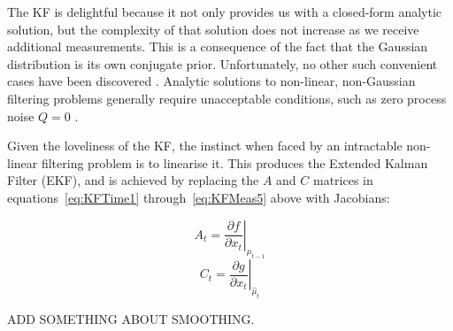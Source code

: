 The KF is delightful because it not only provides us with a closed-form analytic solution, but the complexity of that solution does not increase as we receive additional measurements. This is a consequence of the fact that the Gaussian distribution is its own conjugate prior. Unfortunately, no other such convenient cases have been discovered \cite{Daum2005}. Analytic solutions to non-linear, non-Gaussian filtering problems generally require unacceptable conditions, such as zero process noise $Q=0$ \cite{Daum2005}.

Given the loveliness of the KF, the instinct when faced by an intractable non-linear filtering problem is to linearise it. This produces the Extended Kalman Filter (EKF), and is achieved by replacing the $A$ and $C$ matrices in equations~\ref{eq:KFTime1} through~\ref{eq:KFMeas5} above with Jacobians:

\begin{equation}
A_t = \left . \frac{\partial f}{\partial x_t} \right \vert _{\mu_{t-1}}
\label{eq:EKF1}
\end{equation}
\begin{equation}
C_t = \left . \frac{\partial g}{\partial x_t} \right \vert _{\hat{\mu}_t}
\label{eq:EKF2}
\end{equation}

ADD SOMETHING ABOUT SMOOTHING.